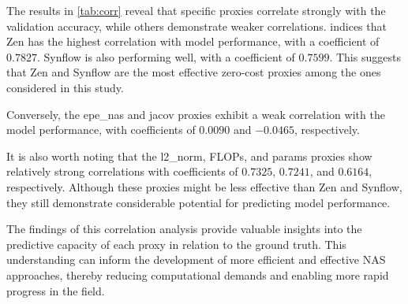 The results in \cref{tab:corr} reveal that specific proxies correlate strongly with the validation accuracy, while others demonstrate weaker correlations.  indices that Zen has the highest correlation with model performance, with a coefficient of $0.7827$. \gls{Synflow} is also performing well, with a coefficient of $0.7599$. This suggests that Zen and \gls{Synflow} are the most effective zero-cost proxies among the ones considered in this study. 

Conversely, the epe\_nas and jacov proxies exhibit a weak correlation with the model performance, with coefficients of $0.0090$ and $-0.0465$, respectively. 

It is also worth noting that the l2\_norm, \gls{FLOPs}, and params proxies show relatively strong correlations with coefficients of $0.7325$, $0.7241$, and $0.6164$, respectively. Although these proxies might be less effective than Zen and \gls{Synflow}, they still demonstrate considerable potential for predicting model performance.

The findings of this correlation analysis provide valuable insights into the predictive capacity of each proxy in relation to the ground truth. This understanding can inform the development of more efficient and effective \gls{NAS} approaches, thereby reducing computational demands and enabling more rapid progress in the field.